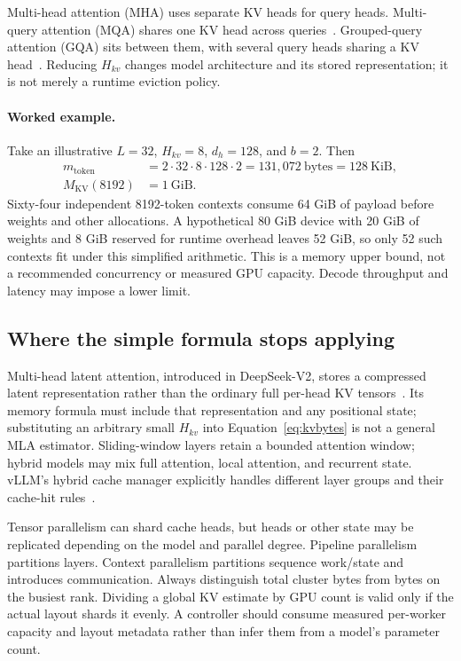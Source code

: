 Multi-head attention (MHA) uses separate KV heads for query heads. Multi-query
attention (MQA) shares one KV head across queries~\cite{mqa}. Grouped-query
attention (GQA) sits between them, with several query heads sharing a KV
head~\cite{gqa}. Reducing $H_{kv}$ changes model architecture and its stored
representation; it is not merely a runtime eviction policy.

\paragraph{Worked example.}
Take an illustrative $L=32$, $H_{kv}=8$, $d_h=128$, and $b=2$. Then
\begin{align}
 m_{\mathrm{token}}&=2\cdot32\cdot8\cdot128\cdot2
 =131{,}072\ \mathrm{bytes}=128\ \mathrm{KiB},\\
 M_{\mathrm{KV}}(8192)&=1\ \mathrm{GiB}.
\end{align}
Sixty-four independent 8192-token contexts consume 64 GiB of payload before
weights and other allocations. A hypothetical 80 GiB device with 20 GiB of
weights and 8 GiB reserved for runtime overhead leaves 52 GiB, so only 52 such
contexts fit under this simplified arithmetic. This is a memory upper bound,
not a recommended concurrency or measured GPU capacity. Decode throughput and
latency may impose a lower limit.


\subsection{Where the simple formula stops applying}
Multi-head latent attention, introduced in DeepSeek-V2, stores a compressed latent
representation rather than the ordinary full per-head KV tensors~\cite{mla}.
Its memory formula must include that representation and any positional state;
substituting an arbitrary small $H_{kv}$ into Equation~\ref{eq:kvbytes} is not a
general MLA estimator. Sliding-window layers retain a bounded attention window;
hybrid models may mix full attention, local attention, and recurrent state.
vLLM's hybrid cache manager explicitly handles different layer groups and their
cache-hit rules~\cite{hybrid}.

Tensor parallelism can shard cache heads, but heads or other state may be
replicated depending on the model and parallel degree. Pipeline parallelism
partitions layers. Context parallelism partitions sequence work/state and
introduces communication. Always distinguish total cluster bytes from bytes on
the busiest rank. Dividing a global KV estimate by GPU count is valid only if
the actual layout shards it evenly. A controller should consume measured
per-worker capacity and layout metadata rather than infer them from a model's
parameter count.


